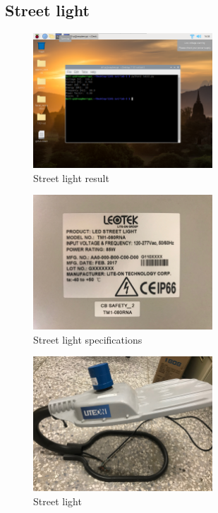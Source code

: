 \documentclass[12pt, a4paper, onside]{article}
\begin{document}
\clearpage

\subsection{Street light}
\begin{figure}[h]
  \centering
  \includegraphics[width=0.6\textwidth]{img/7_res_street_light}
  \caption{Street light result}
\end{figure}
\begin{figure}[h]
  \centering
  \includegraphics[angle=180, origin=c, width=0.6\textwidth]{img/7_spe_street_light}
  \caption{Street light specifications}
\end{figure}
\begin{figure}[h]
  \centering
  \includegraphics[width=0.6\textwidth]{img/7_pic_street_light}
  \caption{Street light}
\end{figure}
\end{document}
